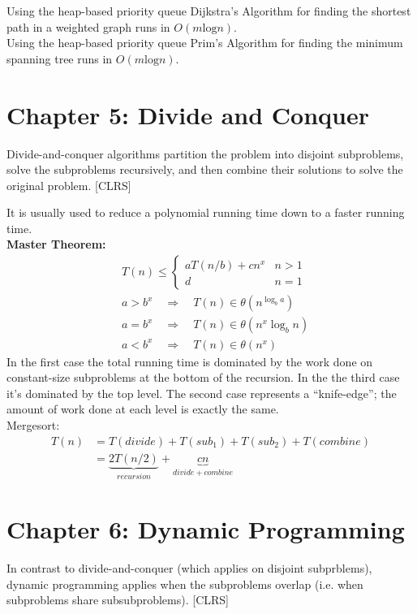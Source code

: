 \documentclass{report}
\begin{document}
Using the heap-based priority queue Dijkstra's Algorithm for finding the shortest path in a weighted graph runs in $O(m\text{log}n)$.\\

Using the heap-based priority queue Prim's Algorithm for finding the minimum spanning tree runs in $O(m\text{log}n)$.
\section*{Chapter 5: Divide and Conquer}
Divide-and-conquer algorithms partition the problem into disjoint subproblems, solve the subproblems recursively, and then combine their solutions to solve the original problem. [CLRS]

It is usually used to reduce a polynomial running time down to a faster running time.\\

\textbf{Master Theorem:}
\begin{align*}
&    T(n)\leq
    \begin{cases}
      aT(n/b)+cn^x & n>1 \\
      d & n=1
    \end{cases}\\
& a>b^x \quad \Rightarrow \quad T(n)\in \theta(n^{\log_ba})\\
& a=b^x \quad \Rightarrow \quad T(n)\in\theta(n^x\log_bn)\\
&a<b^x  \quad \Rightarrow \quad T(n)\in\theta(n^x)
\end{align*}
In the first case the total running time is dominated by the work done on constant-size subproblems at the bottom of the recursion. In the the third case it's dominated by the top level. The second case represents a 
``knife-edge''; the amount of work done at each level is exactly the same.\\

Mergesort: 
\begin{align*}
T(n) &= T(divide)+T(sub_1)+T(sub_2)+T(combine)\\
     &=\underbrace{2T(n/2)}_{recursion}+\underbrace{cn}_{divide+combine}
\end{align*}

\section*{Chapter 6: Dynamic Programming}
In contrast to divide-and-conquer (which applies on disjoint subprblems), dynamic programming applies when the subproblems overlap (i.e. when subproblems share subsubproblems). [CLRS]
\end{document}
